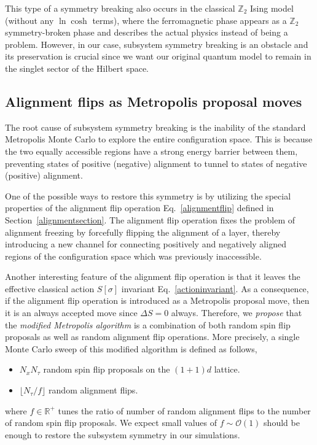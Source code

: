 \documentclass[../thesis_main.tex]{subfiles}
\begin{document}
This type of a symmetry breaking also occurs in the classical $\mathbb{Z}_2$ Ising model (without any $\ln \cosh$ terms), where the ferromagnetic phase appears as a $\mathbb{Z}_2$ symmetry-broken phase and describes the actual physics instead of being a problem. However, in our case, subsystem symmetry breaking is an obstacle and its preservation is crucial since we want our original quantum model to remain in the singlet sector of the Hilbert space.

\subsection{Alignment flips as Metropolis proposal moves}
The root cause of subsystem symmetry breaking is the inability of the standard Metropolis Monte Carlo to explore the entire configuration space. This is because the two equally accessible regions have a strong energy barrier between them, preventing states of positive (negative) alignment to tunnel to states of negative (positive) alignment.

One of the possible ways to restore this symmetry is by utilizing the special properties of the alignment flip operation Eq.~\eqref{alignmentflip} defined in Section~\ref{alignmentsection}. The alignment flip operation fixes the problem of alignment freezing by forcefully flipping the alignment of a layer, thereby introducing a new channel for connecting positively and negatively aligned regions of the configuration space which was previously inaccessible.

Another interesting feature of the alignment flip operation is that it leaves the effective classical action $S[\sigma]$ invariant Eq.~\eqref{actioninvariant}. As a consequence, if the alignment flip operation is introduced as a Metropolis proposal move, then it is an always accepted move since $\Delta S = 0$ always. Therefore, we \textit{propose} that the \textit{modified Metropolis algorithm} is a combination of both random spin flip proposals as well as random alignment flip operations. More precisely, a single Monte Carlo sweep of this modified algorithm is defined as follows,
\begin{itemize}
    \setlength{\itemsep}{0.1em}
    \item $N_x N_\tau$ random spin flip proposals on the $(1+1)d$ lattice.   
    \item $\lfloor N_\tau/f \rfloor$ random alignment flips.
\end{itemize}
where $f \in \mathbb{R}^+$ tunes the ratio of number of random alignment flips to the number of random spin flip proposals. We expect small values of $f \sim \mathcal{O}(1)$ should be enough to restore the subsystem symmetry in our simulations.
\end{document}
